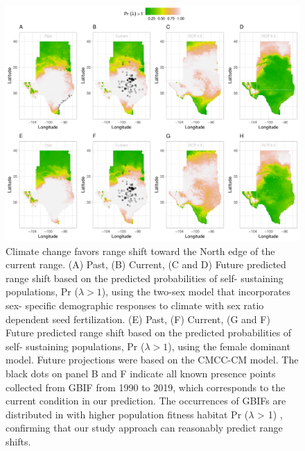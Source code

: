 \documentclass[12pt]{article}
\begin{document}
\begin{figure}[H]
  \begin{center}
    \includegraphics[width=0.95\linewidth]{Figures/Fig_geoPrlambdacmc.pdf}
  \caption{Climate change favors range shift toward the North edge of the current range.
  (A) Past, (B) Current, (C and D) Future predicted range shift based on the predicted probabilities of self- sustaining populations, Pr ($\lambda > 1$), using the two-sex model that incorporates sex- specific demographic responses to climate with sex ratio dependent seed fertilization.
  (E) Past, (F) Current, (G and F) Future  predicted range shift based on the predicted probabilities of self- sustaining populations, Pr ($\lambda > 1$), using the female dominant model.
  Future projections were based on the  CMCC-CM model.
  The black dots on panel B and F indicate all known presence points collected from GBIF from 1990 to 2019, which corresponds to the current condition in our prediction. 
  The occurrences of GBIFs are distributed in with higher population fitness habitat Pr ($\lambda$ > 1) , confirming that our study approach can reasonably predict range shifts.}
  \label{Sup:geoprojcmc}
  \end{center}
\end{figure}
\end{document}
